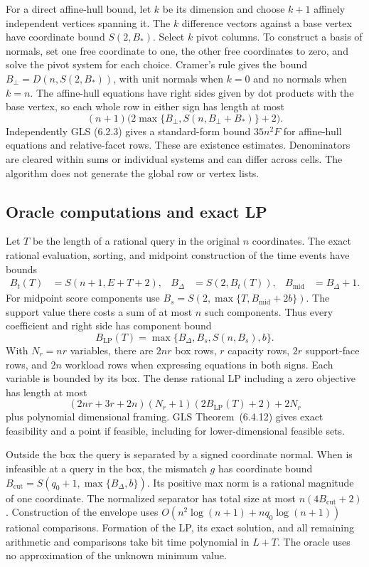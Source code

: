 For a direct affine-hull bound, let $k$ be its dimension and choose $k+1$ affinely independent vertices spanning it. The $k$ difference vectors against a base vertex have coordinate bound $S(2,B_*)$. Select $k$ pivot columns. To construct a basis of normals, set one free coordinate to one, the other free coordinates to zero, and solve the pivot system for each choice. Cramer's rule gives the bound $B_\perp=D(n,S(2,B_*))$, with unit normals when $k=0$ and no normals when $k=n$. The affine-hull equations have right sides given by dot products with the base vertex, so each whole row in either sign has length at most
\[
 (n+1)\bigl(2\max\{B_\perp,S(n,B_\perp+B_*)\}+2\bigr).
\]
Independently GLS (6.2.3) gives a standard-form bound $35n^2F$ for affine-hull equations and relative-facet rows. These are existence estimates. Denominators are cleared within sums or individual systems and can differ across cells. The algorithm does not generate the global row or vertex lists.

\subsection{Oracle computations and exact LP}
Let $T$ be the length of a rational query in the original $n$ coordinates. The exact rational evaluation, sorting, and midpoint construction of the time events have bounds
\begin{align*}
 B_t(T)&=S(n+1,E+T+2),&
 B_\Delta&=S(2,B_t(T)),&
 B_{\mathrm{mid}}&=B_\Delta+1 .
\end{align*}
For midpoint score components use $B_s=S(2,\max\{T,B_{\mathrm{mid}}+2b\})$. The support value there costs a sum of at most $n$ such components. Thus every \FaceLP{} coefficient and right side has component bound
\[
 B_{\mathrm{LP}}(T)=\max\{B_\Delta,B_s,S(n,B_s),b\}.
\]
With $N_r=nr$ variables, there are $2nr$ box rows, $r$ capacity rows, $2r$ support-face rows, and $2n$ workload rows when expressing equations in both signs. Each variable is bounded by its box. The dense rational LP including a zero objective has length at most
\[
 (2nr+3r+2n)(N_r+1)(2B_{\mathrm{LP}}(T)+2)+2N_r
\]
plus polynomial dimensional framing. GLS Theorem~(6.4.12) gives exact feasibility and a point if feasible, including for lower-dimensional feasible sets.

Outside the box the query is separated by a signed coordinate normal. When \FaceLP{} is infeasible at a query in the box, the mismatch $g$ has coordinate bound $B_{\mathrm{cut}}=S(q_0+1,\max\{B_\Delta,b\})$. Its positive max norm is a rational magnitude of one coordinate. The normalized separator has total size at most $n(4B_{\mathrm{cut}}+2)$. Construction of the envelope uses $O(n^2\log(n+1)+nq_0\log(n+1))$ rational comparisons. Formation of the LP, its exact solution, and all remaining arithmetic and comparisons take bit time polynomial in $L+T$. The oracle uses no approximation of the unknown minimum value.

